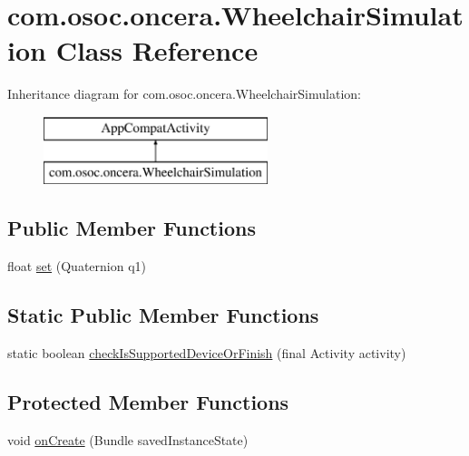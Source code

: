 \hypertarget{classcom_1_1osoc_1_1oncera_1_1_wheelchair_simulation}{}\section{com.\+osoc.\+oncera.\+Wheelchair\+Simulation Class Reference}
\label{classcom_1_1osoc_1_1oncera_1_1_wheelchair_simulation}
Inheritance diagram for com.\+osoc.\+oncera.\+Wheelchair\+Simulation\+:\begin{figure}[H]
\begin{center}
\leavevmode
\includegraphics[height=2.000000cm]{classcom_1_1osoc_1_1oncera_1_1_wheelchair_simulation}
\end{center}
\end{figure}
\subsection*{Public Member Functions}
\begin{DoxyCompactItemize}
\item 
float \mbox{\hyperlink{classcom_1_1osoc_1_1oncera_1_1_wheelchair_simulation_abe82a50fd607d3f929d5071813b9839e}{set}} (Quaternion q1)
\end{DoxyCompactItemize}
\subsection*{Static Public Member Functions}
\begin{DoxyCompactItemize}
\item 
static boolean \mbox{\hyperlink{classcom_1_1osoc_1_1oncera_1_1_wheelchair_simulation_a36dde16db43f7196ea01fcf2a38c14b3}{check\+Is\+Supported\+Device\+Or\+Finish}} (final Activity activity)
\end{DoxyCompactItemize}
\subsection*{Protected Member Functions}
\begin{DoxyCompactItemize}
\item 
void \mbox{\hyperlink{classcom_1_1osoc_1_1oncera_1_1_wheelchair_simulation_ac9324432150bd59c89d5b0979edf0d1e}{on\+Create}} (Bundle saved\+Instance\+State)
\end{DoxyCompactItemize}


